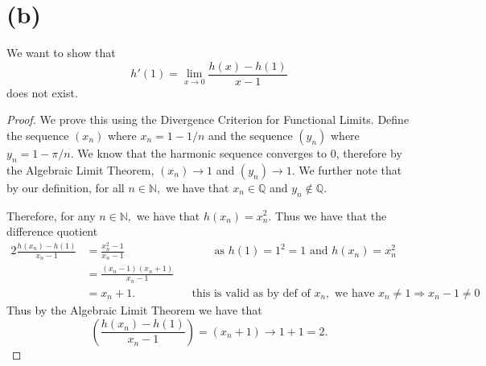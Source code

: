 \documentclass[10pt]{article}
\begin{document}
\section*{(b)}
We want to show that
    \begin{equation}
        h'(1)= \lim_{x\to 0} \frac{h(x)-h(1)}{x-1}
    \end{equation}
    does not exist.
\begin{proof}
    We prove this using the Divergence Criterion for Functional Limits.
    Define the sequence $(x_n)$ where $x_n = 1 - 1/n$ and the sequence $(y_n)$ where $ y_n = 1 - \pi/n.$ We know that the harmonic sequence converges to $0$, therefore by the Algebraic Limit Theorem, $(x_n)\to 1$ and $(y_n)\to 1.$ We further note that by our definition, for all $n\in\mathbb{N},$ we have that $x_n\in\mathbb{Q}$ and $y_n\notin\mathbb{Q}.$


    Therefore, for any $n\in\mathbb{N},$ we have that $h(x_n)=x_n^2.$ Thus we have that the difference quotient
    \begin{alignat*}{2}
        \frac{h(x_n)-h(1)}{x_n-1} &= \frac{x_n^2-1}{x_n-1} &&\qquad\text{as }h(1)=1^2=1\text{ and } h(x_n)=x_n^2\\
        &= \frac{(x_n-1)(x_n+1)}{x_n-1}\\
        &= x_n+1. &&\text{this is valid as by def of $x_n,$ we have } x_n\neq 1\Rightarrow x_n-1\neq 0
    \end{alignat*}
    Thus by the Algebraic Limit Theorem we have that
    \begin{equation} \label{eq:t}
        \left (\frac{h(x_n)-h(1)}{x_n-1} \right ) = (x_n + 1) \to 1+1=2.
    \end{equation}


\end{proof}
\end{document}
